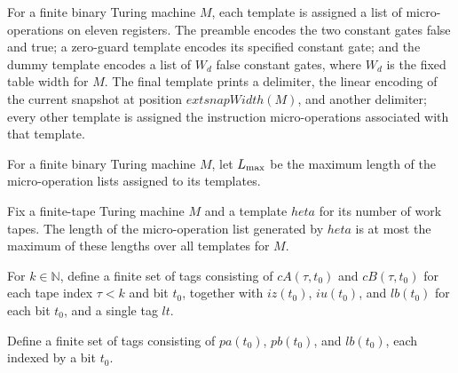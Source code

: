 \begin{definition}
\label{Complexity.UTab.tmpl}
\leanok
{}
For a finite binary Turing machine $M$, each template is assigned a list of
micro-operations on eleven registers. The preamble encodes the two constant gates false
and true; a zero-guard template encodes its specified constant gate; and the dummy
template encodes a list of $W_d$ false constant gates, where $W_d$ is the fixed table
width for $M$. The final template prints a delimiter, the linear encoding of the current
snapshot at position $	ext{snapWidth}(M)$, and another delimiter; every other template
is assigned the instruction micro-operations associated with that template.
\end{definition}

\begin{definition}
\label{Complexity.UTab.Lmax}
\leanok
{}
For a finite binary Turing machine $M$, let $L_{\rm max}$ be the maximum length of the
micro-operation lists assigned to its templates.
\end{definition}

\begin{theorem}
\label{Complexity.UTab.length_tmpl_le}
\leanok
{}
Fix a finite-tape Turing machine $M$ and a template $	heta$ for its number of work
tapes. The length of the micro-operation list generated by $	heta$ is at most the
maximum of these lengths over all templates for $M$.
\end{theorem}

\begin{definition}
\label{Complexity.UTab.CpS}
\leanok
For $k\in\mathbb N$, define a finite set of tags consisting of $cA(\tau,t_0)$ and
$cB(\tau,t_0)$ for each tape index $\tau<k$ and bit $t_0$, together with $iz(t_0)$,
$iu(t_0)$, and $lb(t_0)$ for each bit $t_0$, and a single tag $lt$.
\end{definition}

\begin{definition}
\label{Complexity.UTab.ClS}
\leanok
Define a finite set of tags consisting of $pa(t_0)$, $pb(t_0)$, and $lb(t_0)$, each
indexed by a bit $t_0$.
\end{definition}

